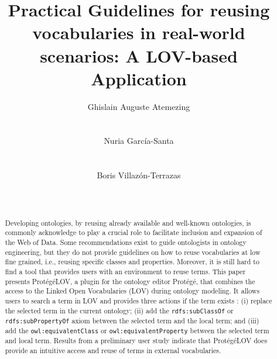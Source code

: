 \documentclass{sig-alternate}
\begin{document}


\title{Practical Guidelines for reusing vocabularies in real-world scenarios: A LOV-based Application}

\author{
\alignauthor Ghislain Auguste Atemezing\\
       \\
       \\
  \alignauthor Nuria Garc{\'i}a-Santa\\
       \\
       \\
\alignauthor Boris Villaz{\'o}n-Terrazas\\
       \\
       \\
}

\maketitle



\begin{abstract}
Developing ontologies, by reusing already available and well-known ontologies, is commonly acknowledge to play a crucial role to facilitate inclusion and expansion of the Web of Data. Some recommendations exist to guide ontologists in ontology engineering, but they do not provide guidelines on how to reuse vocabularies at low fine grained, i.e., reusing specific classes and properties. Moreover, it is still hard to find a tool that provides users with an environment to reuse terms. This paper presents Prot{\'e}g{\'e}LOV, a plugin for the ontology editor Prot{\'e}g{\'e}, that combines the access to the Linked Open Vocabularies (LOV) during ontology modeling. It allows users to search a term in LOV and provides three actions if the term exists : (i) replace the selected term in the current ontology; (ii) add the {\tt rdfs:subClassOf} or {\tt rdfs:subPropertyOf} axiom between the selected term and the local term; and (iii) add the {\tt owl:equivalentClass} or {\tt owl:equivalentProperty} between the selected term and local term. Results from a preliminary user study indicate that Prot{\'e}g{\'e}LOV does provide an intuitive access and reuse of terms in external vocabularies.
\end{abstract}
\end{document}
